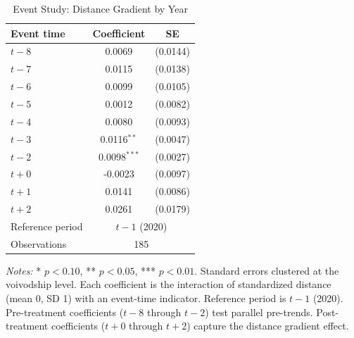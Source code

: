 \begin{table}[H]
\centering
\caption{Event Study: Distance Gradient by Year}
\begin{threeparttable}
\begin{tabular}{lcc}
\toprule
Event time & Coefficient & SE \\
\midrule
$t-8$ & 0.0069 & (0.0144) \\
$t-7$ & 0.0115 & (0.0138) \\
$t-6$ & 0.0099 & (0.0105) \\
$t-5$ & 0.0012 & (0.0082) \\
$t-4$ & 0.0080 & (0.0093) \\
$t-3$ & 0.0116$^{**}$ & (0.0047) \\
$t-2$ & 0.0098$^{***}$ & (0.0027) \\
$t+0$ & -0.0023 & (0.0097) \\
$t+1$ & 0.0141 & (0.0086) \\
$t+2$ & 0.0261 & (0.0179) \\
\midrule
Reference period & \multicolumn{2}{c}{$t-1$ (2020)} \\
Observations & \multicolumn{2}{c}{185} \\
\bottomrule
\end{tabular}
\begin{tablenotes}[flushleft]
\small
\item \textit{Notes:} * $p<0.10$, ** $p<0.05$, *** $p<0.01$. Standard errors clustered at the voivodship level. Each coefficient is the interaction of standardized distance (mean 0, SD 1) with an event-time indicator. Reference period is $t-1$ (2020). Pre-treatment coefficients ($t-8$ through $t-2$) test parallel pre-trends. Post-treatment coefficients ($t+0$ through $t+2$) capture the distance gradient effect.
\end{tablenotes}
\end{threeparttable}
\label{tab:event_study}
\end{table}

